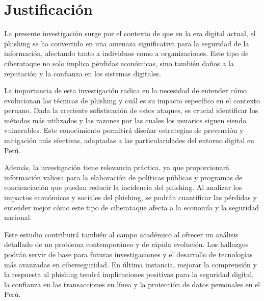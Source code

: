 \section{Justificación}

La presente investigación surge por el contexto de que en la era digital actual, el phishing se ha convertido en una amenaza significativa para la seguridad de la información, afectando tanto a individuos como a organizaciones. Este tipo de ciberataque no solo implica pérdidas económicas, sino también daños a la reputación y la confianza en los sistemas digitales.

La importancia de esta investigación radica en la necesidad de entender cómo evolucionan las técnicas de phishing y cuál es su impacto específico en el contexto peruano. Dada la creciente sofisticación de estos ataques, es crucial identificar los métodos más utilizados y las razones por las cuales los usuarios siguen siendo vulnerables. Este conocimiento permitirá diseñar estrategias de prevención y mitigación más efectivas, adaptadas a las particularidades del entorno digital en Perú.

Además, la investigación tiene relevancia práctica, ya que proporcionará información valiosa para la elaboración de políticas públicas y programas de concienciación que puedan reducir la incidencia del phishing. Al analizar los impactos económicos y sociales del phishing, se podrán cuantificar las pérdidas y entender mejor cómo este tipo de ciberataque afecta a la economía y la seguridad nacional.

Este estudio contribuirá también al campo académico al ofrecer un análisis detallado de un problema contemporáneo y de rápida evolución. Los hallazgos podrán servir de base para futuras investigaciones y el desarrollo de tecnologías más avanzadas en ciberseguridad. En última instancia, mejorar la comprensión y la respuesta al phishing tendrá implicaciones positivas para la seguridad digital, la confianza en las transacciones en línea y la protección de datos personales en el Perú.


